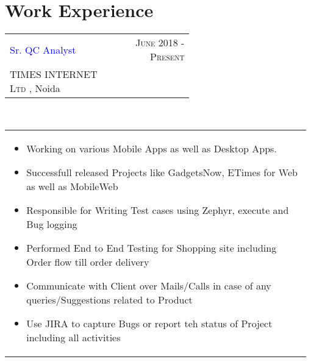 \documentclass[a4paper]{article} %
\newcommand{\verticalspacing}{-0.25cm}
\newcommand{\bulletspace}{0.7cm}
\newcommand{\projectheadspacing}{6.9cm}
\newcommand{\highlight}[2]{%
    \begin{tabular}{p{2.4cm}|l}
        \textsc {\large #1} & #2
    \end{tabular}
}
\newcommand{\cproject}[5]{%
    \begin{tabular}{p{0.60\linewidth}r}
        \textcolor{blue}{\small #2} & \multicolumn{1}{m{ \projectheadspacing{} }}{\raggedleft \small {\textsc{#1}}}\\
        \small {#3} & \small {#4}
    \end{tabular}\\
    \begin{tabular}{p{0.98\linewidth}}
    \vspace{-0.3cm}
        \small{#5}
    \end{tabular}
    \vspace{\verticalspacing{}}
}
\begin{document}
%
%





%
\section{Work Experience}

\cproject
      {June 2018 - Present}
      {Sr. QC Analyst}
      {\textsc{TIMES INTERNET Ltd }, Noida}
      {}
      {%
        \begin{itemize}[leftmargin=\bulletspace{}]
          \item Working on various Mobile Apps as well as Desktop Apps.
          \item Successfull released Projects like GadgetsNow, ETimes for Web as well as MobileWeb
          \item Responsible for Writing Test cases using Zephyr, execute and Bug logging
          \item Performed End to End Testing for Shopping site including Order flow till order delivery
	    \item Communicate with Client over Mails/Calls in case of any queries/Suggestions related to Product
          \item Use JIRA to capture Bugs or report teh status of Project including all activities 
        \end{itemize}
}
\end{document}
